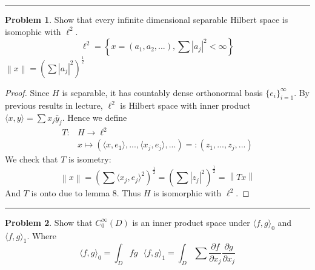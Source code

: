 \documentclass[a4paper, 10pt]{article}
\theoremstyle{definition}
\newtheorem{problem}{Problem}
\theoremstyle{hSol}
\begin{document}
\noindent\rule{16cm}{0.4pt}
\begin{problem} Show that every infinite dimensional separable Hilbert space is isomophic with $\ell^2$.
$$\ell^2 = \left\{x=(a_1, a_2, ... ), \sum |a_j|^2 < \infty\right\}$$
$\left\|x\right\|=\left(\sum |a_j|^2\right)^{\frac{1}{2}}$
\end{problem}
\begin{proof} Since $H$ is separable, it has countably dense orthonormal basis $\{e_i\}_{i=1}^{\infty}$. By previous results in lecture, $\ell^2$ is Hilbert space with inner product $\langle x,y \rangle=\sum x_j \bar{y}_j$. Hence we define
\begin{equation}
	\begin{split}
		T: & H \to \ell^2 \\
		& x \mapsto (\langle x,e_1 \rangle, ..., \langle x_j, e_j \rangle, ...)=:(z_1, ..., z_j, ...)
	\end{split}
\end{equation}
We check that $T$ is isometry:
\begin{equation}
	\left\|x\right\| = \left(\sum \langle x_j, e_j \rangle^2 \right)^{\frac{1}{2}} = \left(\sum |z_j|^2 \right)^{\frac{1}{2}} = \left\|Tx\right\|
\end{equation}
And $T$ is onto due to lemma 8. Thus $H$ is isomorphic with $\ell^2$.
\end{proof}

\noindent\rule{16cm}{0.4pt}
\begin{problem} Show that $C_0^{\infty}(D)$ is an inner product space under $\langle f,g \rangle_0$ and $\langle f,g \rangle_1$. Where
$$
\langle f,g \rangle_0 = \int_D fg~~~\langle f,g \rangle_1 = \int_D \sum \frac{\partial f}{\partial x_j}\frac{\partial g}{\partial x_j}
$$
\end{problem}
\end{document}
